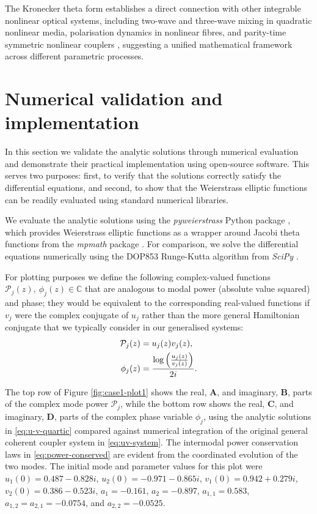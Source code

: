 \documentclass[11pt,a4paper]{article}
\numberwithin{equation}{section}
\begin{document}
The Kronecker theta form establishes a direct connection with other integrable nonlinear optical systems, including two-wave and three-wave mixing in quadratic nonlinear media, polarisation dynamics in nonlinear fibres, and parity-time symmetric nonlinear couplers \cite{heskethGeneralComplexEnvelope2015}, suggesting a unified mathematical framework across different parametric processes.




\section{Numerical validation and implementation} \label{sec:num-val}

In this section we validate the analytic solutions through numerical evaluation and demonstrate their practical implementation using open-source software.
This serves two purposes: first, to verify that the solutions correctly satisfy the differential equations, and second, to show that the Weierstrass elliptic functions can be readily evaluated using standard numerical libraries.

We evaluate the analytic solutions using the \emph{pyweierstrass} Python package \cite{laurentPyweierstrass2022}, which provides Weierstrass elliptic functions as a wrapper around Jacobi theta functions from the \emph{mpmath} package \cite{MpmathPythonLibrary2023}. 
For comparison, we solve the differential equations numerically using the DOP853 Runge-Kutta algorithm from \emph{SciPy} \cite{virtanenSciPy10Fundamental2020}.

For plotting purposes we define the following complex-valued functions $\mathcal{P}_j(z),\ \phi_j(z) \in \mathbb{C}$ that are analogous to modal power (absolute value squared) and phase; they would be equivalent to the corresponding real-valued functions if $v_j$ were the complex conjugate of $u_j$ rather than the more general Hamiltonian conjugate that we typically consider in our generalised systems:
\begin{align}
\mathcal{P}_j(z) &= u_j(z)v_j(z), \notag \\
\phi_j(z) &= \frac{\log\left(\frac{u_j(z)}{v_j(z)}\right)}{2 i}. \label{eq:A-phi-u-v}
\end{align}

The top row of Figure \ref{fig:case1-plot1} shows the real, \textbf{A}, and imaginary, \textbf{B}, parts of the complex mode power $\mathcal{P}_j$,  
while the bottom row shows the real, \textbf{C}, and imaginary, \textbf{D}, parts of the complex phase variable $\phi_j$, using the analytic solutions in \eqref{eq:u-v-quartic} compared against numerical integration of the original general coherent coupler system in \eqref{eq:uv-system}.
The intermodal power conservation laws in \eqref{eq:power-conserved} are evident from the coordinated evolution of the two modes. 
The initial mode and parameter values for this plot were $u_1(0)=0.487-0.828i$, $u_2(0)=-0.971-0.865i$, $v_1(0)=0.942 + 0.279i$, $v_2(0)=0.386-0.523i$, $a_1=-0.161$, $a_2=-0.897$, $a_{1,1}=0.583$, $a_{1,2}=a_{2,1}=-0.0754$, and $a_{2,2}=-0.0525$.
\end{document}
